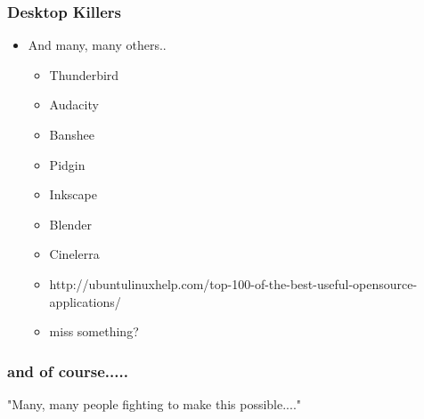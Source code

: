 \documentclass{beamer}
\begin{document}
\begin{frame}
\frametitle{Desktop Killers }

\begin{itemize}
\item And many, many others..
\begin{itemize}
\item Thunderbird
\item Audacity
\item Banshee
\item Pidgin
\item Inkscape
\item Blender
\item Cinelerra
\item http://ubuntulinuxhelp.com/top-100-of-the-best-useful-opensource-applications/
\item miss something?
\end{itemize}
\end{itemize}

\end{frame}

\begin{frame}
\frametitle{and of course.....}

"Many, many people fighting to make this possible...."

\end{frame}
\end{document}

